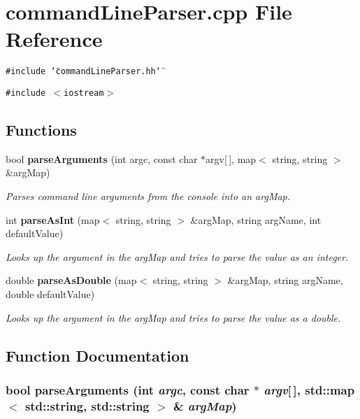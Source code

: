 \section{commandLineParser.cpp File Reference}
\label{commandLineParser_8cpp}


{\tt \#include \char`\"{}commandLineParser.hh\char`\"{}}\par
{\tt \#include $<$iostream$>$}\par
\subsection*{Functions}
\begin{CompactItemize}
\item 
bool {\bf parseArguments} (int argc, const char $\ast$argv[$\,$], map$<$ string, string $>$ \&argMap)
\begin{CompactList}\small\item\em Parses command line arguments from the console into an argMap. \item\end{CompactList}\item 
int {\bf parseAsInt} (map$<$ string, string $>$ \&argMap, string argName, int defaultValue)
\begin{CompactList}\small\item\em Looks up the argument in the argMap and tries to parse the value as an integer. \item\end{CompactList}\item 
double {\bf parseAsDouble} (map$<$ string, string $>$ \&argMap, string argName, double defaultValue)
\begin{CompactList}\small\item\em Looks up the argument in the argMap and tries to parse the value as a double. \item\end{CompactList}\end{CompactItemize}


\subsection{Function Documentation}
\subsubsection[parseArguments]{\setlength{\rightskip}{0pt plus 5cm}bool parseArguments (int {\em argc}, \/  const char $\ast$ {\em argv}[$\,$], \/  std::map$<$ std::string, std::string $>$ \& {\em argMap})}\label{commandLineParser_8cpp_db6c1353f5ffe64f1c40d49ddf1f4b74}


